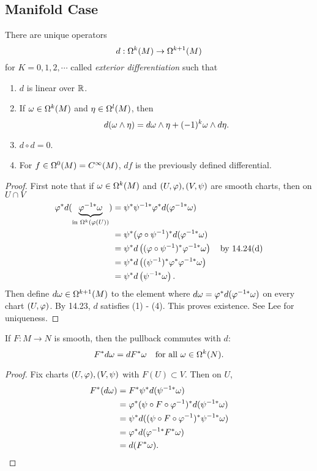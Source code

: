 \subsection{Manifold Case}
\begin{theorem}\label{14.24}
    There are unique operators 
    $$d:\Omega^k(M) \to \Omega^{k+1}(M)$$ for $K = 0,1,2,\cdots$ called \textit{exterior differentiation} such that 
    \begin{enumerate}
    \item $d$ is linear over $\mathbb{R}$.
    \item If $\omega \in \Omega^k(M)$ and $\eta \in \Omega^l(M)$, then $$d(\omega \wedge \eta) = d\omega \wedge \eta + (-1)^k \omega \wedge d\eta. $$
    \item $d \circ d = 0$. 
    \item For $f \in \Omega^0(M) = C^\infty(M)$, $df$ is the previously defined differential.
    \end{enumerate}
\end{theorem}
\begin{proof}
    First note that if $\omega \in \Omega^k(M)$ and $(U,\varphi), (V,\psi)$ are smooth charts, then on $U \cap V$
    \begin{align*}
    \varphi^* d(\underbrace{\varphi^{{-1}*} \omega}_{\text{in }\Omega^k(\varphi(U))})
    &= \psi^*\psi^{-1*}\varphi^* d(\varphi^{-1*}\omega) \\
    &= \psi^*(\varphi \circ \psi^{-1})^* d(\varphi^{-1*}\omega) \\
    &= \psi^* d\left(
    (\varphi \circ \psi^{-1})^* \varphi^{-1*} \omega
    \right) \quad \text{by 14.24(d)}\\
    &= \psi^*d\left(
    (\psi^{-1})^* \varphi^* \varphi^{-1*} \omega
    \right) \\
    &= \psi^* d\left(\psi^{-1*} \omega \right).
    \end{align*}
    Then define $d\omega \in \Omega^{k+1}(M)$ to the element where $d\omega = \varphi^* d(\varphi^{-1*}\omega)$ on every chart $(U,\varphi)$. By 14.23, $d$ satisfies (1) - (4). This proves existence. See Lee for uniqueness. 
\end{proof}
\begin{proposition}\label{14.26}
    If $F:M \to N$ is smooth, then the pullback commutes with $d$:
    $$F^*d\omega = dF^* \omega \quad \text{for all }\omega \in \Omega^k(N). $$
\end{proposition}
\begin{proof}
    Fix charts $(U,\varphi),(V,\psi)$ with $F(U) \subset V$. Then on $U$,
    \begin{align*}
    F^*(d\omega) &= F^* \psi^* d(\psi^{-1*}\omega) \\
    &= \varphi^*(\psi \circ F \circ \varphi^{-1})^* d(\psi^{-1*}\omega) \\
    &= \psi^* d( (\psi \circ F \circ \varphi^{-1})^* \psi^{-1*}\omega) \\
    &= \varphi^* d(\varphi^{-1*}F^* \omega) \\
    &= d(F^*\omega). 
    \end{align*}
\end{proof}
